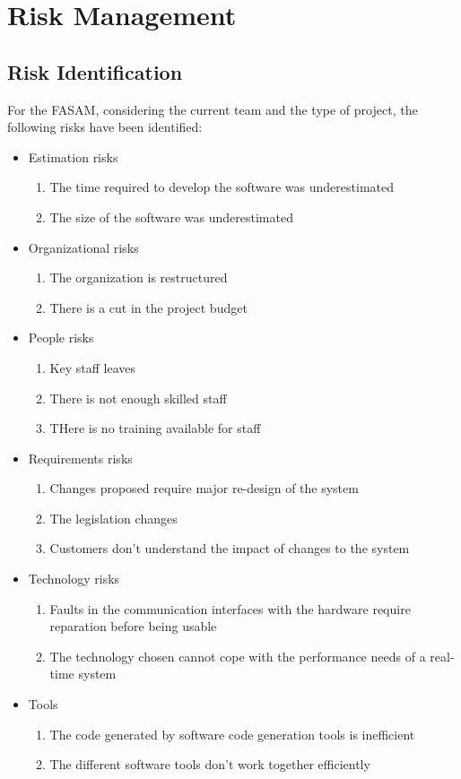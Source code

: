 \chapter{Risk Management}
\section{Risk Identification}
For the FASAM, considering the current team and the type of project, the following risks have been identified:
\begin{itemize}
    \item Estimation risks
    \begin{enumerate}
        \item The time required to develop the software was underestimated
        \item The size of the software was underestimated
    \end{enumerate}
    \item Organizational risks
    \begin{enumerate}
        \item The organization is restructured
        \item There is a cut in the project budget
    \end{enumerate}
    \item People risks
    \begin{enumerate}
        \item Key staff leaves
        \item There is not enough skilled staff
        \item THere is no training available for staff
    \end{enumerate}
    \item Requirements risks
    \begin{enumerate}
        \item Changes proposed require major re-design of the system
        \item The legislation changes
        \item Customers don't understand the impact of changes to the system
    \end{enumerate}
    \item Technology risks
    \begin{enumerate}
        \item Faults in the communication interfaces with the hardware require reparation before being usable
        \item The technology chosen cannot cope with the performance needs of a real-time system
    \end{enumerate}
    \item Tools
    \begin{enumerate}
        \item The code generated by software code generation tools is inefficient
        \item The different software tools don't work together efficiently
    \end{enumerate}
\end{itemize}

